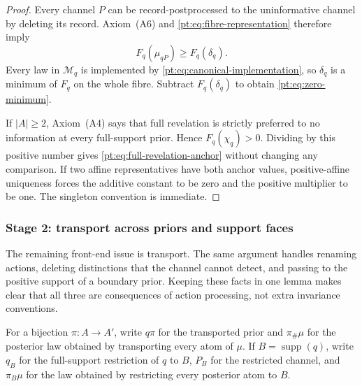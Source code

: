 \begin{proof}
Every channel $P$ can be record-postprocessed to the uninformative channel by
deleting its record.  Axiom~\textup{(A6)} and
\eqref{pt:eq:fibre-representation} therefore imply
\[
 F_q(\mu_{qP})\ge F_q(\delta_q).
\]
Every law in $\mathcal M_q$ is implemented by
\eqref{pt:eq:canonical-implementation}, so $\delta_q$ is a minimum of $F_q$
on the whole fibre.  Subtract $F_q(\delta_q)$ to obtain
\eqref{pt:eq:zero-minimum}.

If $|A|\ge2$, Axiom~\textup{(A4)} says that full revelation is strictly
preferred to no information at every full-support prior.  Hence
$F_q(\chi_q)>0$.  Dividing by this positive number gives
\eqref{pt:eq:full-revelation-anchor} without changing any comparison.  If two
affine representatives have both anchor values, positive-affine uniqueness
forces the additive constant to be zero and the positive multiplier to be
one.  The singleton convention is immediate.
\end{proof}

\subsubsection{Stage 2: transport across priors and support faces}

The remaining front-end issue is transport.  The same argument handles
renaming actions, deleting distinctions that the channel cannot detect, and
passing to the positive support of a boundary prior.  Keeping these facts in
one lemma makes clear that all three are consequences of action processing,
not extra invariance conventions.

For a bijection $\pi:A\to A'$, write $q\pi$ for the transported prior and
$\pi_\#\mu$ for the posterior law obtained by transporting every atom of
$\mu$.  If $B=\operatorname{supp}(q)$, write $q_B$ for the full-support
restriction of $q$ to $B$, $P_B$ for the restricted channel, and
$\pi_B\mu$ for the law obtained by restricting every posterior atom to $B$.

